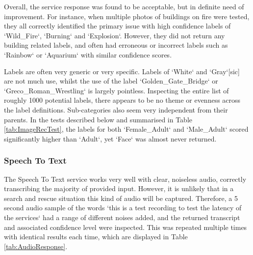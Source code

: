 \documentclass{article}
\begin{document}
Overall, the service response was found to be acceptable, but in definite need of improvement. For instance, when multiple photos of buildings on fire were tested, they all correctly identified the primary issue with high confidence labels of `Wild\_Fire`, `Burning` and `Explosion`. However, they did not return any building related labels, and often had erroneous or incorrect labels such as `Rainbow` or `Aquarium` with similar confidence scores. 

Labels are often very generic or very specific. Labels of `White` and `Gray`[sic] are not much use, whilst the use of the label `Golden\_Gate\_Bridge` or `Greco\_Roman\_Wrestling` is largely pointless. Inspecting the entire list of roughly 1000 potential labels, there appears to be no theme or evenness across the label definitions. Sub-categories also seem very independent from their parents. In the tests described below and summarised in Table \ref{tab:ImageRecTest}, the labels for both `Female\_Adult` and `Male\_Adult` scored significantly higher than `Adult`, yet `Face` was almost never returned. 





\subsubsection{Speech To Text}\label{testSpeechRec}
The Speech To Text service works very well with clear, noiseless audio, correctly transcribing the majority of provided input. However, it is unlikely that in a search and rescue situation this kind of audio will be captured. Therefore, a 5 second audio sample of the words `this is a test recording to test the latency of the services` had a range of different noises added, and the returned transcript and associated confidence level were inspected. This was repeated multiple times with identical results each time, which are displayed in Table \ref{tab:AudioResponse}.
\end{document}
